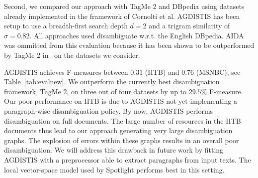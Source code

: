 Second, we compared our approach with TagMe 2 and DBpedia using datasets already implemented in the framework of Cornolti et al.
AGDISTIS has been setup to use a breadth-first search depth $d=2$ and a trigram similarity of $\sigma=0.82$.
All approaches used disambiguate w.r.t. the English DBpedia.
AIDA was ommitted from this evaluation because it has been shown to be outperformed by TagMe 2 in~\cite{cornolti} on the datasets we consider. 

AGDISTIS achieves \mbox{F-measures} between $0.31$ (IITB) and $0.76$ (MSNBC), see Table~\ref{tab:evalnew}.
We outperform the currently best disambiguation framework, TagMe 2, on three out of four datasets by up to $29.5\%$ F-measure. 
Our poor performance on IITB is due to AGDISTIS not yet implementing a paragraph-wise disambiguation policy. 
By now, AGDISTIS performs disambiguation on full documents.
The large number of resources in the IITB documents thus lead to our approach generating very large disambiguation graphs.
The explosion of errors within these graphs results in an overall poor disambiguation.
We will address this drawback in future work by fitting AGDISTIS with a preprocessor able to extract paragraphs from input texts.
The local vector-space model used by Spotlight performs best in this setting. 
